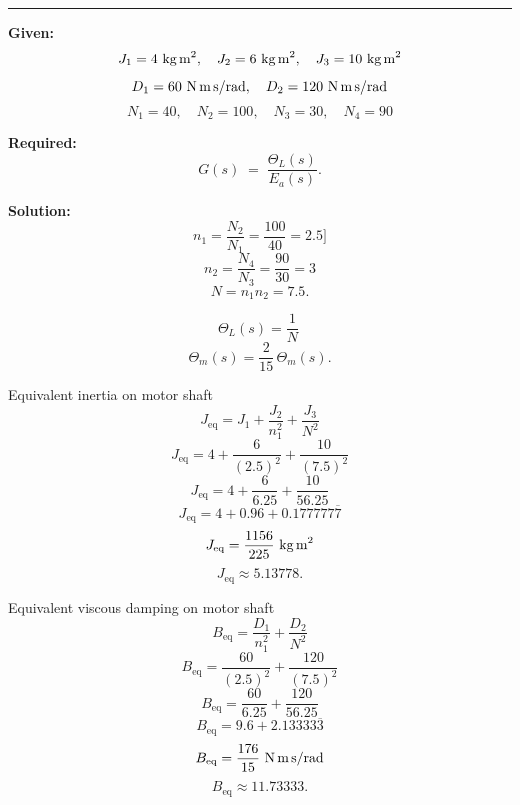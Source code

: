 \begin{figure}[h!]
\end{figure}

\noindent\rule{\textwidth}{1pt}

\textbf{Given:}
\[
J_1 = 4\ \text{kg\,m}^2, \quad J_2 = 6\ \text{kg\,m}^2, \quad J_3 = 10\ \text{kg\,m}^2
\]
\[
D_1 = 60\ \text{N\,m\,s/rad}, \quad D_2 = 120\ \text{N\,m\,s/rad}
\]
\[
N_1 = 40, \quad N_2 = 100, \quad N_3 = 30, \quad N_4 = 90
\]

\textbf{Required:}
\[
G(s)\;=\;\frac{\Theta_L(s)}{E_a(s)}.
\]

\textbf{Solution:}
\[
n_1=\frac{N_2}{N_1}=\frac{100}{40}=2.5
]\]
\[
n_2=\frac{N_4}{N_3}=\frac{90}{30}=3
\]
\[N=n_1 n_2=7.5 .
\]

\[
\Theta_L(s)=\frac{1}{N}\
\]
\[
\Theta_m(s)=\frac{2}{15}\,\Theta_m(s).
\]

Equivalent inertia on motor shaft
\[
J_{\text{eq}}=J_1+\frac{J_2}{n_1^2}+\frac{J_3}{N^2}
\]
\[
J_{\text{eq}}=4+\frac{6}{(2.5)^2}+\frac{10}{(7.5)^2}
\]
\[J_{\text{eq}}=4+\frac{6}{6.25}+\frac{10}{56.25}
\]
\[
J_{\text{eq}}=4+0.96+0.177777\overline{7}
\]
\[
J_{\text{eq}}=\frac{1156}{225}\ \text{kg\,m}^2
\]
\[
J_{\text{eq}}\approx 5.13778.
\]

Equivalent viscous damping on motor shaft
\[
B_{\text{eq}}=\frac{D_1}{n_1^2}+\frac{D_2}{N^2}
\]
\[
B_{\text{eq}}=\frac{60}{(2.5)^2}+\frac{120}{(7.5)^2} 
\]
\[
B_{\text{eq}}=\frac{60}{6.25}+\frac{120}{56.25}
\]
\[
B_{\text{eq}}=9.6+2.13333\overline{3}
\]
\[
B_{\text{eq}}=\frac{176}{15}\ \text{N\,m\,s/rad}
\]
\[
B_{\text{eq}}\approx 11.73333.
\]

